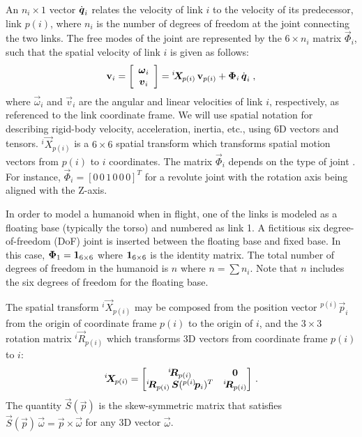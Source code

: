 \documentclass{llncs}
\newcommand{\bq}{\mbox{\boldmath $q$}}
\newcommand{\bzero}{\mbox{\boldmath $0$}}
\newcommand{\vp}{\vec{p}}
\newcommand{\BM}{\begin{bmatrix}}
\newcommand{\EM}{\end{bmatrix}}
\newcommand{\vPhi}{\vec{\Phi}}
\newcommand{\vomega}{\vec{\omega}}
\newcommand{\bone}{{\bf 1}}
\newcommand{\Pos}[2]{{}^{#1}\!\vp_{#2}}
\newcommand{\vq}{\vec{q}}
\newcommand{\vqd}{\dot{\vq}}
\newcommand{\vR}{\vec{R}}
\newcommand{\Rot}[2]{{}^{#1}\!\vR_{#2}}
\newcommand{\vS}{\vec{S}}
\newcommand{\vv}{\vec{v}}
\newcommand{\bv}{{\bf v}}
\newcommand{\vX}{\vec{X}}
\newcommand{\XM}[2]{{}^{#1}\!\vX_{\!#2}}
\begin{document}
An $n_i \times 1$ vector $\dot{\bq}_i$ relates the velocity of link $i$
to the velocity of its predecessor, link $p(i)$, where $n_i$ is the number
of degrees of freedom at the joint connecting the two links.  The free
modes of the joint are represented by the $6 \times n_i$ matrix
$\vPhi_i$, such that the spatial velocity of link $i$ is given as
follows:
%
%
\begin{equation}
\label{eq:spatialvelocity}
\bv_i =        \left[ \begin{array}{c} \vomega_i \\ \vv_i \end{array} \right] =
\XM{i}{p(i)} \, \bv_{p(i)} + \vPhi_i \, \vqd_i \; ,
\end{equation}
%
where $\vomega_i$ and $\vv_i$ are the angular and linear velocities
of link $i$, respectively, as referenced to the
link coordinate frame.
We will use spatial notation \cite{FeOr08,Featherstone87} for describing rigid-body velocity, acceleration, inertia, etc., using 6D vectors and tensors.
$\XM{i}{p(i)}$ is a $6 \times 6$ spatial
transform which transforms spatial motion vectors from $p(i)$ to $i$
coordinates.  The matrix $\vPhi_i$ depends on the type of joint
\cite{FeOr08}. %
For instance, $\vPhi_i = \left[ 0 \, 0 \, 1 \, 0 \, 0 \, 0 \right]^T$ for a
revolute joint with the rotation axis being aligned with the Z-axis. 

In order to model a humanoid when in flight, one of the links is
modeled as a floating base (typically the torso) and numbered as link 1.
A fictitious six degree-of-freedom (DoF) joint is inserted between the
floating base and fixed base.  In this case, $\vPhi_1 = \bone_{6 \times 6}$
where $\bone_{6 \times 6}$ is the identity matrix.  The total number of degrees of freedom in the
humanoid is $n$ where $n= \sum n_i$.  Note that $n$ includes the
six degrees of freedom for the floating base.

The spatial transform $\XM{i}{p(i)}$ may be composed from the position
vector $\Pos{p(i)}{i}$ from the origin of coordinate frame $p(i)$ to
the origin of $i$, and
the $3 \times 3$ rotation matrix $\Rot{i}{p(i)}$ which transforms
3D vectors from coordinate frame $p(i)$ to $i$:
%
\begin{equation}
\label{eq:ST}
\XM{i}{p(i)}
= \BM \Rot{i}{p(i)} & \bzero \\
              \Rot{i}{p(i)} \,\vS(\Pos{p(i)}{i})^T & \Rot{i}{p(i)} \EM \, .
\end{equation}
%
The quantity $\vS(\vp)$ is the skew-symmetric matrix that satisfies
$\vS(\vp)\,\vomega = \vp \times \vomega$ for any 3D vector $\vomega$.
\end{document}
